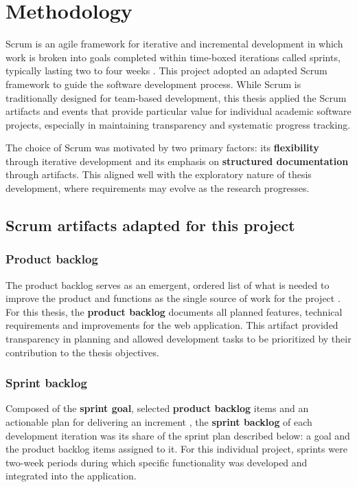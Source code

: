 \chapter{Methodology}
\label{chap:methodology}

Scrum is an agile framework for iterative and incremental development in which work is broken into goals completed within time-boxed iterations called sprints, typically lasting two to four weeks \autocite{schwaber2020scrum}. This project adopted an adapted Scrum framework to guide the software development process. While Scrum is traditionally designed for team-based development, this thesis applied the Scrum artifacts and events that provide particular value for individual academic software projects, especially in maintaining transparency and systematic progress tracking.

The choice of Scrum was motivated by two primary factors: its \textbf{flexibility} through iterative development and its emphasis on \textbf{structured documentation} through artifacts. This aligned well with the exploratory nature of thesis development, where requirements may evolve as the research progresses.

\section{Scrum artifacts adapted for this project}

\subsection{Product backlog}

The product backlog serves as an emergent, ordered list of what is needed to improve the product and functions as the single source of work for the project \autocite{schwaber2020scrum}. For this thesis, the \textbf{product backlog} documents all planned features, technical requirements and improvements for the web application. This artifact provided transparency in planning and allowed development tasks to be prioritized by their contribution to the thesis objectives.

\subsection{Sprint backlog}

Composed of the \textbf{sprint goal}, selected \textbf{product backlog} items and an actionable plan for delivering an increment \autocite{schwaber2020scrum}, the \textbf{sprint backlog} of each development iteration was its share of the sprint plan described below: a goal and the product backlog items assigned to it. For this individual project, sprints were two-week periods during which specific functionality was developed and integrated into the application.

